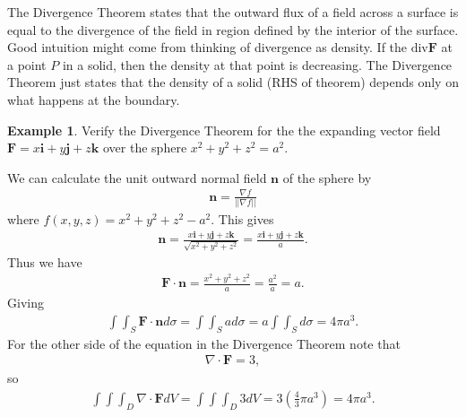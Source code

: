 \documentclass[12pt, letter]{article}
\theoremstyle{plain}
\numberwithin{theorem}{section}
\theoremstyle{definition}
\newtheorem{example}[theorem]{Example}
\begin{document}
\bigskip

The Divergence Theorem states that the outward flux of a field across a surface is equal to the divergence of the field in region defined by the interior of the surface. Good intuition might come from thinking of divergence as density. If the $\text{div}\bm{F}$ at a point $P$ in a solid, then the density at that point is decreasing. The Divergence Theorem just states that the density of a solid (RHS of theorem) depends only on what happens at the boundary.

\bigskip

\hrulefill

\bigskip

\begin{example}
Verify the Divergence Theorem for the the expanding vector field $\bm{F}=x\bm{i}+y\bm{j}+z\bm{k}$ over the sphere $x^2+y^2+z^2=a^2$.

\bigskip

We can calculate the unit outward normal field $\bm{n}$ of the sphere by
\begin{align*}
\bm{n}=\frac{\nabla f}{||\nabla f||}
\end{align*}
where $f(x,y,z) = x^2+y^2+z^2-a^2$. This gives
\begin{align*}
\bm{n} = \frac{x\bm{i}+y\bm{j}+z\bm{k}}{\sqrt{x^2+y^2+z^2}} = \frac{x\bm{i}+y\bm{j}+z\bm{k}}{a}.
\end{align*}
Thus we have
\begin{align*}
\bm{F}\cdot\bm{n} = \frac{x^2+y^2+z^2}{a} = \frac{a^2}{a} = a.
\end{align*}
Giving
\begin{align*}
\int\int_S \bm{F}\cdot\bm{n}d\sigma = \int\int_S ad\sigma = a\int\int_S d\sigma = 4\pi a^3.
\end{align*}
For the other side of the equation in the Divergence Theorem note that
\begin{align*}
\nabla \cdot \bm{F} = 3,
\end{align*}
so 
\begin{align*}
\int\int\int_D \nabla \cdot \bm{F} dV = \int\int\int_D 3dV = 3\left(\frac{4}{3}\pi a^3\right) = 4\pi a^3.
\end{align*}
\end{example}

\bigskip

\hrulefill

\bigskip
\end{document}

